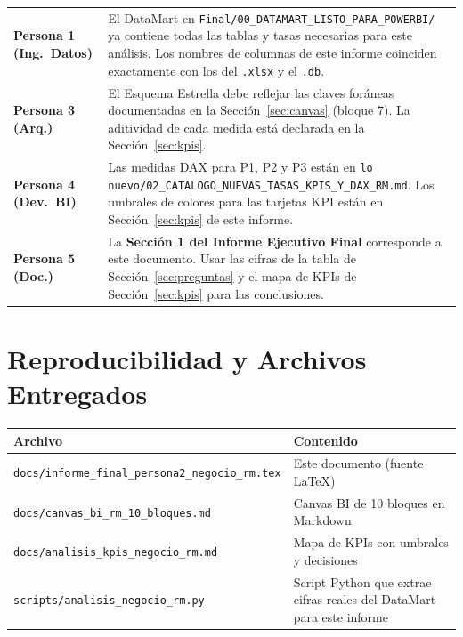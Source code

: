 \documentclass[11pt,a4paper]{article}
\begin{document}
\begin{center}\small
\begin{tabularx}{\textwidth}{@{}>{\bfseries}p{3.0cm}Y@{}}
\toprule
Persona 1 (Ing.\ Datos) &
  El DataMart en \texttt{Final/00\_DATAMART\_LISTO\_PARA\_POWERBI/} ya contiene
  todas las tablas y tasas necesarias para este análisis. Los nombres de columnas
  de este informe coinciden exactamente con los del \texttt{.xlsx} y el \texttt{.db}. \\
Persona 3 (Arq.) &
  El Esquema Estrella debe reflejar las claves foráneas documentadas en la
  Sección~\ref{sec:canvas} (bloque 7). La aditividad de cada medida está
  declarada en la Sección~\ref{sec:kpis}. \\
Persona 4 (Dev.\ BI) &
  Las medidas DAX para P1, P2 y P3 están en
  \texttt{lo nuevo/02\_CATALOGO\_NUEVAS\_TASAS\_KPIS\_Y\_DAX\_RM.md}.
  Los umbrales de colores para las tarjetas KPI están en
  Sección~\ref{sec:kpis} de este informe. \\
Persona 5 (Doc.) &
  La \textbf{Sección 1 del Informe Ejecutivo Final} corresponde a este documento.
  Usar las cifras de la tabla de Sección~\ref{sec:preguntas} y el
  mapa de KPIs de Sección~\ref{sec:kpis} para las conclusiones. \\
\bottomrule
\end{tabularx}
\end{center}

\appendix
\section{Reproducibilidad y Archivos Entregados}

\begin{center}\small
\begin{tabularx}{\textwidth}{@{}lY@{}}
\toprule
\textbf{Archivo} & \textbf{Contenido} \\
\midrule
\texttt{docs/informe\_final\_persona2\_negocio\_rm.tex} & Este documento (fuente \LaTeX) \\
\texttt{docs/canvas\_bi\_rm\_10\_bloques.md} & Canvas BI de 10 bloques en Markdown \\
\texttt{docs/analisis\_kpis\_negocio\_rm.md} & Mapa de KPIs con umbrales y decisiones \\
\texttt{scripts/analisis\_negocio\_rm.py} & Script Python que extrae cifras reales del DataMart para este informe \\
\bottomrule
\end{tabularx}
\end{center}
\end{document}
